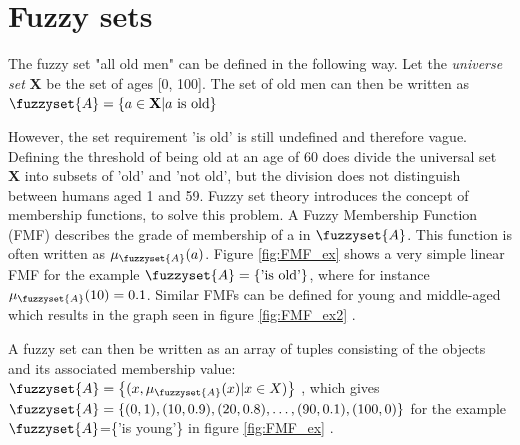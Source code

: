 \section{Fuzzy sets}
The fuzzy set "all old men" can be defined in the following way. Let the \textit{universe set} \textbf{X} be the set of ages [0, 100]. The set of old men can then be written as
$\fuzzyset{A}=\left \{ a \in \textbf{X} | a \text{ is old} \right \}$
\cite{chen2000introduction}

However, the set requirement 'is old' is still undefined and therefore vague. Defining the threshold of being old at an age of 60 does divide the universal set \textbf{X} into subsets of 'old' and 'not old', but the division does not distinguish between humans aged 1 and 59.
Fuzzy set theory introduces the concept of membership functions, to solve this problem. A Fuzzy Membership Function (FMF) describes the grade of membership of a  in  $\fuzzyset{A}$. This function is often written as $\mu_{\fuzzyset{A}}(a)$. Figure \ref{fig:FMF_ex} shows a very simple linear FMF for the example $\fuzzyset{A}=\left \{\text{'is old'} \right \}$, where for instance $\mu_{\fuzzyset{A}}(10)=0.1$. Similar FMFs can be defined for young and middle-aged which results in the graph seen in figure \ref{fig:FMF_ex2} \cite{ross2009fuzzy}.

A fuzzy set can then be written as an array of tuples consisting of the objects and its associated membership value: $\fuzzyset{A}=\left \{(x,\mu_{\fuzzyset{A}}(x)|x \in X) \right \}$ \cite{zimmermann2010fuzzy}, which gives  $\fuzzyset{A}=\left \{(0,1),(10,0.9),(20,0.8),\dots,(90,0.1),(100,0) \right \}$ for the example $\fuzzyset{A}$=\{'is young'\} in figure \ref{fig:FMF_ex} \cite{ross2009fuzzy}.


